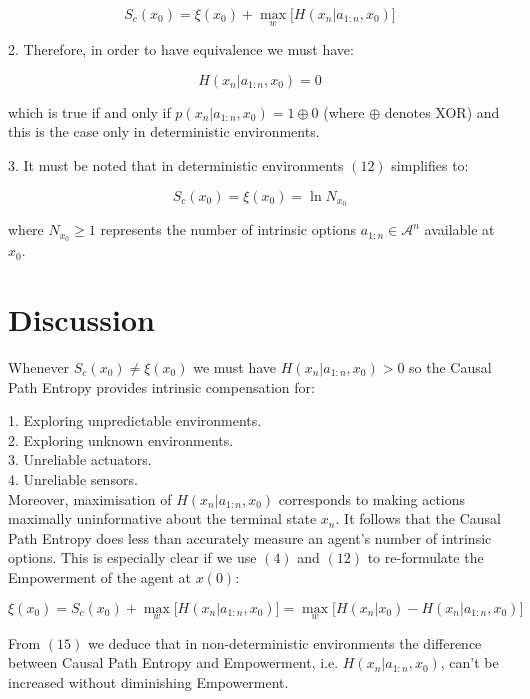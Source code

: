 \documentclass{article}
\begin{document}
\begin{equation}
S_c(x_0) = \xi(x_0)  + \max\limits_{w} \big[H(x_n|a_{1:n},x_0)\big]
\end{equation}

2. Therefore, in order to have equivalence we must have:

\begin{equation}
H(x_n|a_{1:n},x_0) = 0
\end{equation}

which is true if and only if $p(x_n|a_{1:n},x_0) = 1 \oplus 0$ (where $\oplus$ denotes XOR) and this is the case only in deterministic environments. 

3. It must be noted that in deterministic environments $(12)$ simplifies to:

\begin{equation}
S_c(x_0) = \xi(x_0)  = \ln N_{x_0}
\end{equation}

where $N_{x_0} \geq 1$ represents the number of intrinsic options $a_{1:n} \in \mathcal{A}^n$ available at $x_0$. 

\section{Discussion}

Whenever $S_c(x_0) \neq \xi(x_0)$ we must have $H(x_n|a_{1:n},x_0) > 0$ so the Causal Path Entropy provides intrinsic compensation for:

1. Exploring unpredictable environments. \\
2. Exploring unknown environments. \\
3. Unreliable actuators. \\
4. Unreliable sensors. \\

Moreover, maximisation of $H(x_n|a_{1:n},x_0)$ corresponds to making actions maximally uninformative about the terminal state $x_n$. It follows that the Causal Path Entropy does less than accurately measure an agent's number of intrinsic options. This is especially clear if we use $(4)$ and $(12)$ to re-formulate the Empowerment of the agent at $x(0)$:

\begin{equation}
\xi(x_0) = S_c(x_0)  + \max\limits_{w} \big[H(x_n|a_{1:n},x_0)\big] =  \max\limits_{w} \big[H(x_n|x_0) -H(x_n|a_{1:n},x_0)\big]
\end{equation}

From $(15)$ we deduce that in non-deterministic environments the difference between Causal Path Entropy and Empowerment, i.e. $H(x_n|a_{1:n},x_0)$, can't be increased without diminishing Empowerment. 
\end{document}
